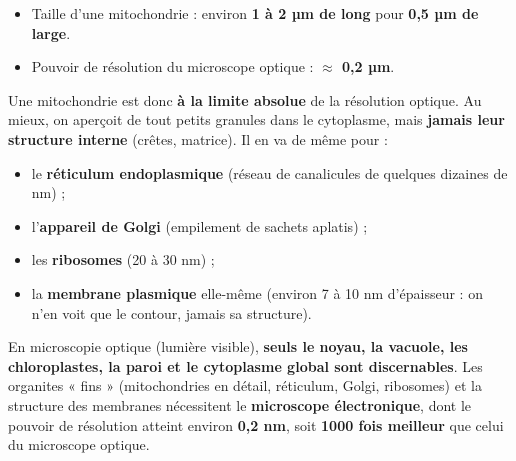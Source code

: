 \documentclass[11pt]{article}
\begin{document}
\begin{itemize}
    \item Taille d'une mitochondrie : environ \textbf{1 à 2 µm de long} pour \textbf{0,5 µm de large}.
    \item Pouvoir de résolution du microscope optique : \textbf{$\approx$ 0,2 µm}.
\end{itemize}
Une mitochondrie est donc \textbf{à la limite absolue} de la résolution optique. Au mieux, on aperçoit de tout petits granules dans le cytoplasme, mais \textbf{jamais leur structure interne} (crêtes, matrice). Il en va de même pour :
\begin{itemize}
    \item le \textbf{réticulum endoplasmique} (réseau de canalicules de quelques dizaines de nm) ;
    \item l'\textbf{appareil de Golgi} (empilement de sachets aplatis) ;
    \item les \textbf{ribosomes} (20 à 30 nm) ;
    \item la \textbf{membrane plasmique} elle-même (environ 7 à 10 nm d'épaisseur : on n'en voit que le contour, jamais sa structure).
\end{itemize}

\begin{propriete}
En microscopie optique (lumière visible), \textbf{seuls le noyau, la vacuole, les chloroplastes, la paroi et le cytoplasme global sont discernables}. Les organites « fins » (mitochondries en détail, réticulum, Golgi, ribosomes) et la structure des membranes nécessitent le \textbf{microscope électronique}, dont le pouvoir de résolution atteint environ \textbf{0,2 nm}, soit \textbf{1000 fois meilleur} que celui du microscope optique.
\end{propriete}
\end{document}
